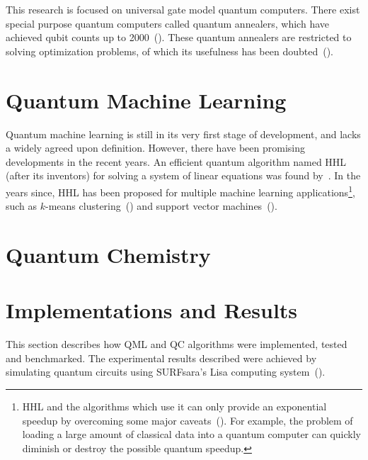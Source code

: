 \documentclass[a4paper,10pt]{article}
\begin{document}
This research is focused on universal gate model quantum computers.
There exist special purpose quantum computers called quantum annealers, which have achieved qubit counts up to 2000~(\cite{dwave-2000}).
These quantum annealers are restricted to solving optimization problems, of which its usefulness has been doubted~(\cite{how-quantum-dwave, aaronson-dwave, detecting-quantum-speedup}).

\section{Quantum Machine Learning} \label{sec:quantum-ml}
Quantum machine learning is still in its very first stage of development, and lacks a widely agreed upon definition.
However, there have been promising developments in the recent years.
An efficient quantum algorithm named HHL (after its inventors) for solving a system of linear equations was found by~\cite{harrow2009quantum}.
In the years since, HHL has been proposed for multiple machine learning applications\footnote{HHL and the algorithms which use it can only provide an exponential speedup by overcoming some major caveats~(\cite{aaronson2015read}). For example, the problem of loading a large amount of classical data into a quantum computer can quickly diminish or destroy the possible quantum speedup.}, such as $k$-means clustering~(\cite{lloyd2013quantum}) and support vector machines~(\cite{rebentrost2014quantum}).

\section{Quantum Chemistry} \label{sec:quantum-chemistry}


\section{Implementations and Results} \label{sec:implementation-and-results}
This section describes how QML and QC algorithms were implemented, tested and benchmarked.
The experimental results described were achieved by simulating quantum circuits using SURFsara's Lisa computing system~(\cite{surfsara-lisa}).
\end{document}
